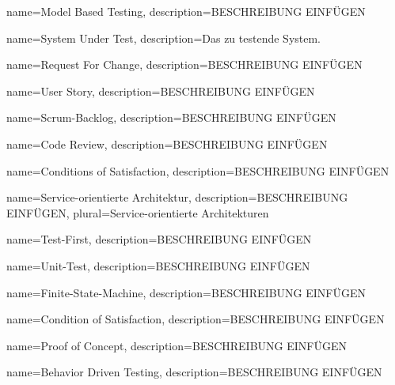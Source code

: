  {
	name={Model Based Testing},
	description={BESCHREIBUNG EINFÜGEN}
}

 {
	name={System Under Test},
	description={Das zu testende System.}
}

 {
	name={Request For Change},
	description={BESCHREIBUNG EINFÜGEN}
}

 {
	name={User Story},
	description={BESCHREIBUNG EINFÜGEN}
}

 {
	name={Scrum-Backlog},
	description={BESCHREIBUNG EINFÜGEN}
}

 {
	name={Code Review},
	description={BESCHREIBUNG EINFÜGEN}
}

 {
	name={Conditions of Satisfaction},
	description={BESCHREIBUNG EINFÜGEN}
}

 {
	name={Service-orientierte Architektur},
	description={BESCHREIBUNG EINFÜGEN},
	plural=Service-orientierte Architekturen
}


 {
	name={Test-First},
	description={BESCHREIBUNG EINFÜGEN}
}

 {
	name={Unit-Test},
	description={BESCHREIBUNG EINFÜGEN}
}

 {
	name={Finite-State-Machine},
	description={BESCHREIBUNG EINFÜGEN}
}

 {
	name={Condition of Satisfaction},
	description={BESCHREIBUNG EINFÜGEN}
}

 {
	name={Proof of Concept},
	description={BESCHREIBUNG EINFÜGEN}
}

 {
	name={Behavior Driven Testing},
	description={BESCHREIBUNG EINFÜGEN}
}